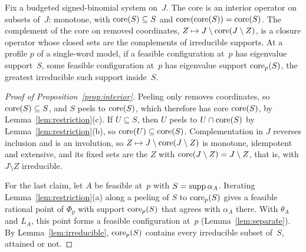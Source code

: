 \begin{proposition}\label{prop:interior}
Fix a budgeted signed-binomial system on~$J$. The core is an interior
operator on subsets of~$J$: monotone, with $\operatorname{core}(S)\subseteq S$ and
$\operatorname{core}(\operatorname{core}(S))=\operatorname{core}(S)$. The complement of the core on removed
coordinates, $Z\mapsto J\setminus\operatorname{core}(J\setminus Z)$, is a closure
operator whose closed sets are the complements of irreducible supports.
At a profile $p$ of a single-word model, if a feasible configuration at~$p$
has eigenvalue support~$S$, some feasible configuration at~$p$ has
eigenvalue support $\operatorname{core}_p(S)$, the greatest irreducible such support
inside~$S$.
\end{proposition}

\begin{proof}[Proof of Proposition~\ref{prop:interior}]
Peeling only removes coordinates, so $\operatorname{core}(S)\subseteq S$, and $S$ peels
to $\operatorname{core}(S)$, which therefore has core $\operatorname{core}(S)$, by
Lemma~\ref{lem:restriction}(c). If $U\subseteq S$, then $U$ peels to $U\cap\operatorname{core}(S)$
by Lemma~\ref{lem:restriction}(b), so $\operatorname{core}(U)\subseteq\operatorname{core}(S)$.
Complementation in $J$ reverses inclusion and is an involution, so
$Z\mapsto J\setminus\operatorname{core}(J\setminus Z)$ is monotone, idempotent and
extensive, and its fixed sets are the $Z$ with
$\operatorname{core}(J\setminus Z)=J\setminus Z$, that is, with $J\setminus Z$
irreducible.

For the last claim, let $A$ be feasible at~$p$ with $S=\operatorname{supp}\alpha_A$.
Iterating Lemma~\ref{lem:restriction}(a) along a peeling of $S$ to
$\operatorname{core}_p(S)$ gives a feasible rational point of $\Phi_p$ with support
$\operatorname{core}_p(S)$ that agrees with $\alpha_A$ there. With $\theta_A$ and $L_A$,
this point forms a feasible configuration at~$p$
(Lemma~\ref{lem:separate}). By Lemma~\ref{lem:irreducible}, $\operatorname{core}_p(S)$
contains every irreducible subset of~$S$, attained or not.
\end{proof}
